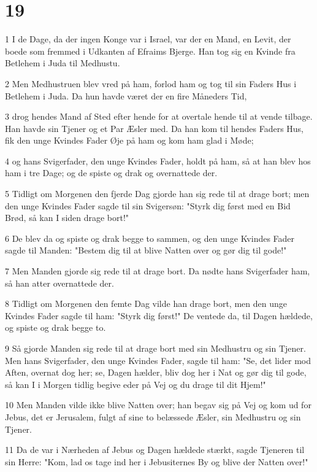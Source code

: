 \chapter{19}

\par 1 I de Dage, da der ingen Konge var i Israel, var der en Mand, en Levit, der boede som fremmed i Udkanten af Efraims Bjerge. Han tog sig en Kvinde fra Betlehem i Juda til Medhustu.
\par 2 Men Medhustruen blev vred på ham, forlod ham og tog til sin Faders Hus i Betlehem i Juda. Da hun havde været der en fire Måneders Tid,
\par 3 drog hendes Mand af Sted efter hende for at overtale hende til at vende tilbage. Han havde sin Tjener og et Par Æsler med. Da han kom til hendes Faders Hus, fik den unge Kvindes Fader Øje på ham og kom ham glad i Møde;
\par 4 og hans Svigerfader, den unge Kvindes Fader, holdt på ham, så at han blev hos ham i tre Dage; og de spiste og drak og overnattede der.
\par 5 Tidligt om Morgenen den fjerde Dag gjorde han sig rede til at drage bort; men den unge Kvindes Fader sagde til sin Svigersøn: "Styrk dig først med en Bid Brød, så kan I siden drage bort!"
\par 6 De blev da og spiste og drak begge to sammen, og den unge Kvindes Fader sagde til Manden: "Bestem dig til at blive Natten over og gør dig til gode!"
\par 7 Men Manden gjorde sig rede til at drage bort. Da nødte hans Svigerfader ham, så han atter overnattede der.
\par 8 Tidligt om Morgenen den femte Dag vilde han drage bort, men den unge Kvindes Fader sagde til ham: "Styrk dig først!" De ventede da, til Dagen hældede, og spiste og drak begge to.
\par 9 Så gjorde Manden sig rede til at drage bort med sin Medhustru og sin Tjener. Men hans Svigerfader, den unge Kvindes Fader, sagde til ham: "Se, det lider mod Aften, overnat dog her; se, Dagen hælder, bliv dog her i Nat og gør dig til gode, så kan I i Morgen tidlig begive eder på Vej og du drage til dit Hjem!"
\par 10 Men Manden vilde ikke blive Natten over; han begav sig på Vej og kom ud for Jebus, det er Jerusalem, fulgt af sine to belæssede Æsler, sin Medhustru og sin Tjener.
\par 11 Da de var i Nærheden af Jebus og Dagen hældede stærkt, sagde Tjeneren til sin Herre: "Kom, lad os tage ind her i Jebusiternes By og blive der Natten over!"
